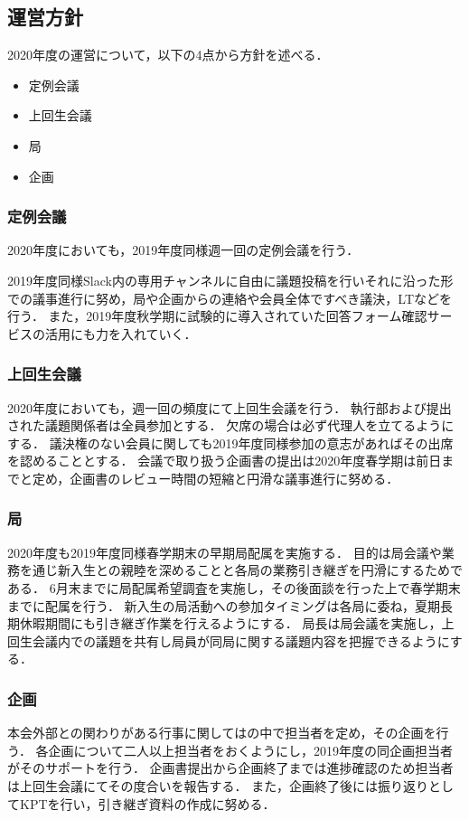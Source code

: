 \subsection*{運営方針}


2020年度の運営について，以下の4点から方針を述べる．
\begin{itemize}
    \item 定例会議
    \item 上回生会議
    \item 局
    \item 企画
\end{itemize}

\subsubsection*{定例会議}
2020年度においても，2019年度同様週一回の定例会議を行う．

2019年度同様Slack内の専用チャンネルに自由に議題投稿を行いそれに沿った形での議事進行に努め，局や企画からの連絡や会員全体ですべき議決，LTなどを行う．
また，2019年度秋学期に試験的に導入されていた回答フォーム確認サービスの活用にも力を入れていく．


\subsubsection*{上回生会議}
2020年度においても，週一回の頻度にて上回生会議を行う．
執行部および提出された議題関係者は全員参加とする．
欠席の場合は必ず代理人を立てるようにする．
議決権のない会員に関しても2019年度同様参加の意志があればその出席を認めることとする．
会議で取り扱う企画書の提出は2020年度春学期は前日までと定め，企画書のレビュー時間の短縮と円滑な議事進行に努める．

\subsubsection*{局}
2020年度も2019年度同様春学期末の早期局配属を実施する．
目的は局会議や業務を通じ新入生との親睦を深めることと各局の業務引き継ぎを円滑にするためである．
6月末までに局配属希望調査を実施し，その後面談を行った上で春学期末までに配属を行う．
新入生の局活動への参加タイミングは各局に委ね，夏期長期休暇期間にも引き継ぎ作業を行えるようにする．
局長は局会議を実施し，上回生会議内での議題を共有し局員が同局に関する議題内容を把握できるようにする．


\subsubsection*{企画}
本会外部との関わりがある行事に関しては\secondGrade{}の中で担当者を定め，その企画を行う．
各企画について二人以上担当者をおくようにし，2019年度の同企画担当者がそのサポートを行う．
企画書提出から企画終了までは進捗確認のため担当者は上回生会議にてその度合いを報告する．
また，企画終了後には振り返りとしてKPTを行い，引き継ぎ資料の作成に努める．
